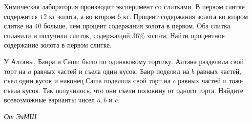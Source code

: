 Химическая лаборатория производит эксперимент со слитками. В первом слитке содержится $12$ кг золота, а во втором $6$ кг. Процент содержания золота во втором слитке на $40$ больше, чем процент содержания золота в первом. Оба слитка сплавили и получили слиток, содержащий $36$\% золота. Найти процентное содержание золота в первом слитке.

\newpage

\hspace{3mm}

У Алтаны, Баира и Саши было по одинаковому тортику. Алтана разделила свой торт на $a$ равных частей и съела один кусок, Баир поделил на $b$ равных частей, съел один кусок и наконец Саша поделила свой торт на $c$ равных частей и тоже съела кусок. Так получилось, что они съели половину от одного торта. Найдите всевозможные варианты чисел $a, b$ и $c$.

\begin{flushright}
    \textit{\small{От ЭлМШ}}
\end{flushright}
